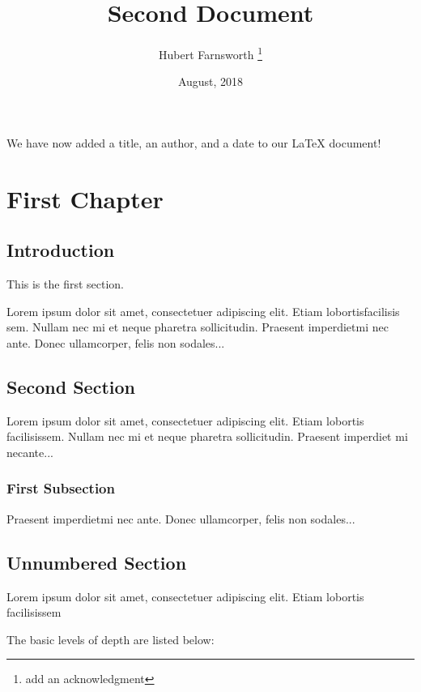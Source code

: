 \documentclass[12pt, letterpaper, twoside]{article}
\title{Second Document}
\author{Hubert Farnsworth \thanks{add an acknowledgment}}
\date{August, 2018}
\begin{document}
	
	\maketitle %
	
	We have now added a title, an author, and a date to our \LaTeX{} document!
	
	\chapter{First Chapter}
	
	\section{Introduction}
	
	This is the first section.
	
	Lorem  ipsum  dolor  sit  amet,  consectetuer  adipiscing  
	elit.   Etiam  lobortisfacilisis sem.  Nullam nec mi et 
	neque pharetra sollicitudin.  Praesent imperdietmi nec ante. 
	Donec ullamcorper, felis non sodales...
	
	\section{Second Section}
	
	Lorem ipsum dolor sit amet, consectetuer adipiscing elit.  
	Etiam lobortis facilisissem.  Nullam nec mi et neque pharetra 
	sollicitudin.  Praesent imperdiet mi necante...
	
	\subsection{First Subsection}
	Praesent imperdietmi nec ante. Donec ullamcorper, felis non sodales...
	
	\section*{Unnumbered Section}
	Lorem ipsum dolor sit amet, consectetuer adipiscing elit.  
	Etiam lobortis facilisissem
	
	The basic levels of depth are listed below:
	
\end{document}

